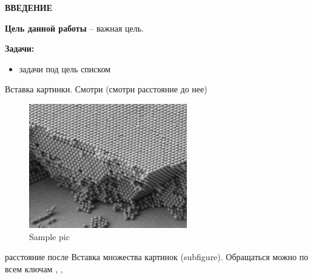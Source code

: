\documentclass[../template.tex]{subfiles}
\begin{document}
	\begin{center}
		\normalsize\bfseries\MakeUppercase{ВВЕДЕНИЕ}
	\end{center}

	
\textbf{Цель данной работы} -- важная цель.

\textbf{Задачи:}
\begin{itemize}
	\item задачи под цель списком
\end{itemize}
	
\cite{kuchyanovLazernayaGeneraciyaOpalopodobnyh2016} %

Вставка картинки. Смотри  (смотри расстояние до нее)

\begin{figure}[h]
	\centering
	\includegraphics[width=0.5\linewidth]{../images/sample_pic.png}
	\caption{Sample pic}
	\label{fig:sample_pic}
\end{figure}
расстояние после
Вставка множества картинок (subfigure). Обращаться можно по всем ключам , , 
\end{document}
